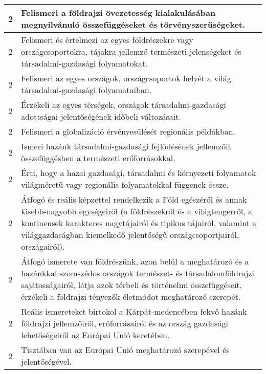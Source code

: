 \begin{longtable}{c | p{} }
                                
                                          2 &  Felismeri a földrajzi övezetesség kialakulásában megnyilvánuló összefüggéseket és törvényszerűségeket. \\ \hline
                                          2 &  Felismeri és értelmezi az egyes földrészekre vagy országcsoportokra, tájakra jellemző természeti jelenségeket és  társadalmi-gazdasági folyamatokat. \\ \hline
                                          2 &  Felismeri az egyes országok, országcsoportok helyét a világ társadalmi-gazdasági folyamataiban. \\ \hline
                                          2 &  Érzékeli az egyes térségek, országok társadalmi-gazdasági adottságai jelentőségének időbeli változásait. \\ \hline
                                          2 &  Felismeri a globalizáció érvényesülését regionális példákban. \\ \hline
                                          2 &  Ismeri hazánk társadalmi-gazdasági fejlődésének jellemzőit összefüggésben a természeti erőforrásokkal. \\ \hline
                                          2 &  Érti, hogy a hazai gazdasági, társadalmi és környezeti folyamatok világméretű vagy regionális folyamatokkal függenek össze. \\ \hline
                                          2 &  Átfogó és reális képzettel rendelkezik a Föld egészéről és annak kisebb-nagyobb egységeiről (a földrészekről és a világtengerről, a kontinensek karakteres nagytájairól és tipikus tájairól, valamint a világgazdaságban kiemelkedő jelentőségű országcsoportjairól, országairól). \\ \hline
                                          2 &  Átfogó ismerete van földrészünk, azon belül a meghatározó és a hazánkkal szomszédos országok természet- és társadalomföldrajzi sajátosságairól, látja azok térbeli és történelmi összefüggéseit, érzékeli a földrajzi tényezők életmódot meghatározó szerepét. \\ \hline
                                          2 &  Reális ismereteket birtokol a Kárpát-medencében fekvő hazánk földrajzi jellemzőiről, erőforrásairól és az ország gazdasági lehetőségeiről az Európai Unió keretében. \\ \hline
                                          2 &  Tisztában van az Európai Unió meghatározó szerepével és jelentőségével. \\ \hline

\end{longtable}
